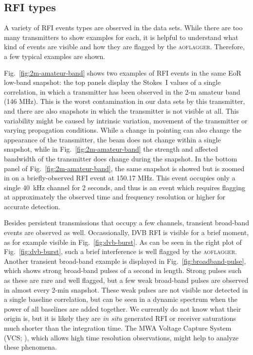 \documentclass{pasa}
\begin{document}
\subsection{RFI types}
A variety of RFI events types are observed in the data sets. While there are too many transmitters to show examples for each, it is helpful to understand what kind of events are visible and how they are flagged by the \textsc{aoflagger}. Therefore, a few typical examples are shown.

Fig.~\ref{fig:2m-amateur-band} shows two examples of RFI events in the same EoR low-band snapshot: the top panels display the Stokes~I values of a single correlation, in which a transmitter has been observed in the 2-m amateur band (146 MHz). This is the worst contamination in our data sets by this transmitter, and there are also snapshots in which the transmitter is not visible at all. This variability might be caused by intrinsic variation, movement of the transmitter or varying propagation conditions. While a change in pointing can also change the appearance of the transmitter, the beam does not change within a single snapshot, while in Fig.~\ref{fig:2m-amateur-band} the strength and affected bandwidth of the transmitter does change during the snapshot. In the bottom panel of Fig.~\ref{fig:2m-amateur-band}, the same snapshot is showed but is zoomed in on a briefly-observed RFI event at 150.17 MHz. This event occupies only a single 40~kHz channel for 2 seconds, and thus is an event which requires flagging at approximately the observed time and frequency resolution or higher for accurate detection.

Besides persistent transmissions that occupy a few channels, transient broad-band events are observed as well. Occassionally, DVB RFI is visible for a brief moment, as for example visible in Fig.~\ref{fig:dvb-burst}. As can be seen in the right plot of Fig.~\ref{fig:dvb-burst}, such a brief interference is well flagged by the \textsc{aoflagger}. Another transient broad-band example is displayed in Fig.~\ref{fig:broadband-pulse}, which shows strong broad-band pulses of a second in length. Strong pulses such as these are rare and well flagged, but a few weak broad-band pulses are observed in almost every 2-min snapshot. These weak pulses are not visible nor detected in a single baseline correlation, but can be seen in a dynamic spectrum when the power of all baselines are added together. We currently do not know what their origin is, but it is likely they are \textit{in situ} generated RFI or receiver saturations much shorter than the integration time. The MWA Voltage Capture System (VCS; \citealt{mwa-voltage-capture-2014}), which allows high time resolution observations, might help to analyze these phenomena.
\end{document}
